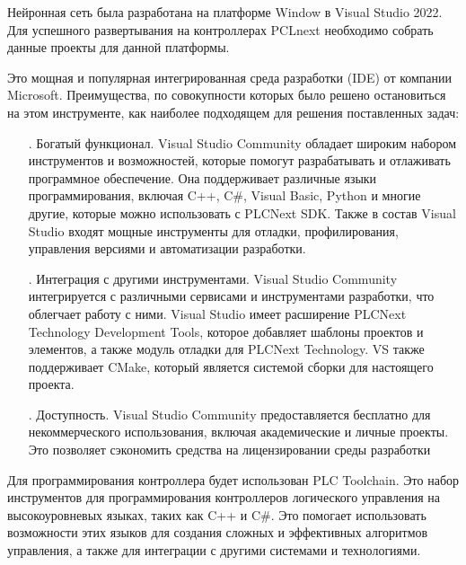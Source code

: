\subtitlespace

{\gostFont
	
	\par \redline Нейронная сеть была разработана на платформе Window в Visual Studio 2022. Для успешного развертывания на контроллерах PCLnext необходимо собрать данные проекты для данной платформы.
	
	\par \redline Это мощная и популярная интегрированная среда разработки (IDE) от компании Microsoft. Преимущества, по совокупности которых было решено остановиться на этом инструменте, как наиболее подходящем для решения поставленных задач:
	
	\begin{itemize}[leftmargin=2.15cm, labelwidth=0.65cm, labelsep=0.0cm] 

		\item[\theitemcntr. ] Богатый функционал. Visual Studio Community обладает широким набором инструментов и возможностей, которые помогут разрабатывать и отлаживать программное обеспечение. Она поддерживает различные языки программирования, включая C++, C\#, Visual Basic, Python и многие другие, которые можно использовать с PLCNext SDK. Также в состав Visual Studio входят мощные инструменты для отладки, профилирования, управления версиями и автоматизации разработки.
		\addtocounter{itemcntr}{1}

		\item[\theitemcntr. ] Интеграция с другими инструментами. Visual Studio Community интегрируется с различными сервисами и инструментами разработки, что облегчает работу с ними. Visual Studio имеет расширение PLCNext Technology Development Tools, которое добавляет шаблоны проектов и элементов, а также модуль отладки для PLCNext Technology. VS также поддерживает CMake, который является системой сборки для настоящего проекта.
		\addtocounter{itemcntr}{1}
		
		\item[\theitemcntr. ] Доступность. Visual Studio Community предоставляется бесплатно для некоммерческого использования, включая академические и личные проекты. Это позволяет сэкономить средства на лицензировании среды разработки
		\addtocounter{itemcntr}{1}
		
		\setcounter{itemcntr}{1}
	\end{itemize} 	

	\par \redline Для программирования контроллера будет использован PLC Toolchain. Это набор инструментов для программирования контроллеров логического управления на высокоуровневых языках, таких как C++ и C\#. Это помогает использовать возможности этих языков для создания сложных и эффективных алгоритмов управления, а также для интеграции с другими системами и технологиями.

}
